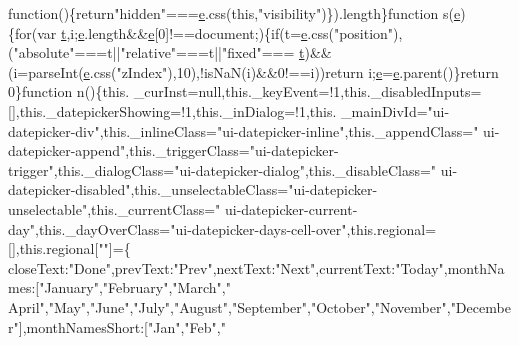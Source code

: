 \begin{DoxyCode}
{      function}()\{\textcolor{keywordflow}{return}\textcolor{stringliteral}{"hidden"}===\hyperlink{jquery-ui_8min_8js_a2c038346d47955cbe2cb91e338edd7e1}{e}.css(\textcolor{keyword}{this},\textcolor{stringliteral}{"visibility"})\}).length\}\textcolor{keyword}{function} s(\hyperlink{jquery-ui_8min_8js_a2c038346d47955cbe2cb91e338edd7e1}{e})\{\textcolor{keywordflow}{for}(var 
      \hyperlink{jquery-2_80_83_8min_8js_aaccc9105df5383111407fd5b41255e23}{t},i;\hyperlink{jquery-ui_8min_8js_a2c038346d47955cbe2cb91e338edd7e1}{e}.length&&\hyperlink{jquery-ui_8min_8js_a2c038346d47955cbe2cb91e338edd7e1}{e}[0]!==document;)\{\textcolor{keywordflow}{if}(t=\hyperlink{jquery-ui_8min_8js_a2c038346d47955cbe2cb91e338edd7e1}{e}.css(\textcolor{stringliteral}{"position"}),(\textcolor{stringliteral}{"absolute"}===t||\textcolor{stringliteral}{"relative"}===t||\textcolor{stringliteral}{"fixed"}===
      \hyperlink{jquery-2_80_83_8min_8js_aaccc9105df5383111407fd5b41255e23}{t})&&(i=parseInt(\hyperlink{jquery-ui_8min_8js_a2c038346d47955cbe2cb91e338edd7e1}{e}.css(\textcolor{stringliteral}{"zIndex"}),10),!isNaN(i)&&0!==i))\textcolor{keywordflow}{return} i;\hyperlink{jquery-ui_8min_8js_a2c038346d47955cbe2cb91e338edd7e1}{e}=\hyperlink{jquery-ui_8min_8js_a2c038346d47955cbe2cb91e338edd7e1}{e}.parent()\}\textcolor{keywordflow}{return} 0\}\textcolor{keyword}{function} n()\{this.
      \_curInst=null,this.\_keyEvent=!1,this.\_disabledInputs=[],this.\_datepickerShowing=!1,this.\_inDialog=!1,this.
      \_mainDivId=\textcolor{stringliteral}{"ui-datepicker-div"},this.\_inlineClass=\textcolor{stringliteral}{"ui-datepicker-inline"},this.\_appendClass=\textcolor{stringliteral}{"
      ui-datepicker-append"},this.\_triggerClass=\textcolor{stringliteral}{"ui-datepicker-trigger"},this.\_dialogClass=\textcolor{stringliteral}{"ui-datepicker-dialog"},this.\_disableClass=\textcolor{stringliteral}{"
      ui-datepicker-disabled"},this.\_unselectableClass=\textcolor{stringliteral}{"ui-datepicker-unselectable"},this.\_currentClass=\textcolor{stringliteral}{"
      ui-datepicker-current-day"},this.\_dayOverClass=\textcolor{stringliteral}{"ui-datepicker-days-cell-over"},this.regional=[],this.regional[\textcolor{stringliteral}{""}]=\{
      closeText:\textcolor{stringliteral}{"Done"},prevText:\textcolor{stringliteral}{"Prev"},nextText:\textcolor{stringliteral}{"Next"},currentText:\textcolor{stringliteral}{"Today"},monthNames:[\textcolor{stringliteral}{"January"},\textcolor{stringliteral}{"February"},\textcolor{stringliteral}{"March"},\textcolor{stringliteral}{"
      April"},\textcolor{stringliteral}{"May"},\textcolor{stringliteral}{"June"},\textcolor{stringliteral}{"July"},\textcolor{stringliteral}{"August"},\textcolor{stringliteral}{"September"},\textcolor{stringliteral}{"October"},\textcolor{stringliteral}{"November"},\textcolor{stringliteral}{"December"}],monthNamesShort:[\textcolor{stringliteral}{"Jan"},\textcolor{stringliteral}{"Feb"},\textcolor{stringliteral}{"
}
\end{DoxyCode}
